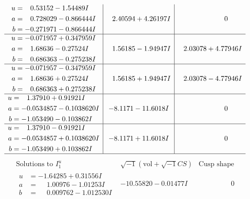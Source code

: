\documentclass[1p]{elsarticle_modified}
\theoremstyle{definition}
\newcommand{\I}{\sqrt{-1}}
\begin{document}
$$\begin{array}{c|c|c}
\begin{aligned}
u &= \phantom{-}0.53152 - 1.54489 I \\
a &= \phantom{-}0.728029 - 0.866444 I \\
b &= -0.271971 - 0.866444 I\end{aligned}
 & \phantom{-}2.40594 + 4.26197 I & \phantom{-0.000000 } 0 \\ \hline\begin{aligned}
u &= -0.071957 + 0.347959 I \\
a &= \phantom{-}1.68636 - 0.27524 I \\
b &= \phantom{-}0.686363 - 0.275238 I\end{aligned}
 & \phantom{-}1.56185 - 1.94947 I & \phantom{-}2.03078 + 4.77946 I \\ \hline\begin{aligned}
u &= -0.071957 - 0.347959 I \\
a &= \phantom{-}1.68636 + 0.27524 I \\
b &= \phantom{-}0.686363 + 0.275238 I\end{aligned}
 & \phantom{-}1.56185 + 1.94947 I & \phantom{-}2.03078 - 4.77946 I \\ \hline\begin{aligned}
u &= \phantom{-}1.37910 + 0.91921 I \\
a &= -0.0534857 - 0.1038620 I \\
b &= -1.053490 - 0.103862 I\end{aligned}
 & -8.1171 - 11.6018 I & \phantom{-0.000000 } 0 \\ \hline\begin{aligned}
u &= \phantom{-}1.37910 - 0.91921 I \\
a &= -0.0534857 + 0.1038620 I \\
b &= -1.053490 + 0.103862 I\end{aligned}
 & -8.1171 + 11.6018 I & \phantom{-0.000000 } 0\\
 \hline 
 \end{array}$$\newpage$$\begin{array}{c|c|c}  
\text{Solutions to }I^u_{1}& \I (\text{vol} + \sqrt{-1}CS) & \text{Cusp shape}\\
 \hline 
\begin{aligned}
u &= -1.64285 + 0.31556 I \\
a &= \phantom{-}1.00976 - 1.01253 I \\
b &= \phantom{-}0.009762 - 1.012530 I\end{aligned}
 & -10.55820 - 0.01477 I & \phantom{-0.000000 } 0 \\ \hline\begin{aligned}

\end{aligned}
\end{array}$$
\end{document}
